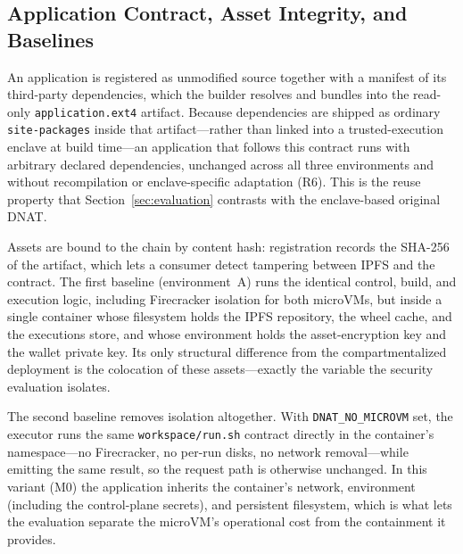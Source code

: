 \subsection{Application Contract, Asset Integrity, and Baselines}

An application is registered as unmodified source together with a manifest of its
third-party dependencies, which the builder resolves and bundles into the read-only
\texttt{application.ext4} artifact. Because dependencies are shipped as ordinary
\texttt{site-packages} inside that artifact---rather than linked into a trusted-execution
enclave at build time---an application that follows this contract runs with arbitrary
declared dependencies, unchanged across all three environments and without recompilation or
enclave-specific adaptation (R6). This is the reuse property that
Section~\ref{sec:evaluation} contrasts with the enclave-based original DNAT.

Assets are bound to the chain by content hash: registration records the SHA-256 of the
artifact, which lets a consumer detect tampering between IPFS and the contract. The first
baseline (environment~A) runs the identical control, build, and execution logic, including
Firecracker isolation for both microVMs, but inside a single container whose filesystem
holds the IPFS repository, the wheel cache, and the executions store, and whose environment
holds the asset-encryption key and the wallet private key. Its only structural difference
from the compartmentalized deployment is the colocation of these assets---exactly the
variable the security evaluation isolates.

The second baseline removes isolation altogether. With \texttt{DNAT\_NO\_MICROVM} set, the
executor runs the same \texttt{workspace/run.sh} contract directly in the container's
namespace---no Firecracker, no per-run disks, no network removal---while emitting the same
result, so the request path is otherwise unchanged. In this variant (M0) the application
inherits the container's network, environment (including the control-plane secrets), and
persistent filesystem, which is what lets the evaluation separate the microVM's operational
cost from the containment it provides.
